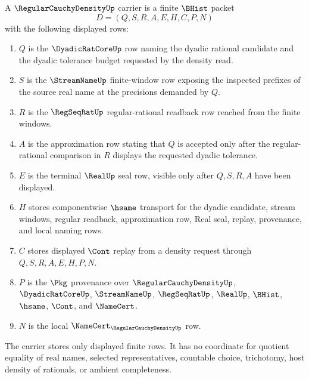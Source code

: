 \begin{definition}
\label{def:regular-cauchy-density-carrier}
A $\RegularCauchyDensityUp$ carrier is a finite $\BHist$ packet
$$
D=(Q,S,R,A,E,H,C,P,N)
$$
with the following displayed rows:
\begin{enumerate}
\item $Q$ is the $\DyadicRatCoreUp$ row naming the dyadic rational candidate
and the dyadic tolerance budget requested by the density read.
\item $S$ is the $\StreamNameUp$ finite-window row exposing the inspected
prefixes of the source real name at the precisions demanded by $Q$.
\item $R$ is the $\RegSeqRatUp$ regular-rational readback row reached from the
finite windows.
\item $A$ is the approximation row stating that $Q$ is accepted only after the
regular-rational comparison in $R$ displays the requested dyadic tolerance.
\item $E$ is the terminal $\RealUp$ seal row, visible only after $Q,S,R,A$
have been displayed.
\item $H$ stores componentwise $\hsame$ transport for the dyadic candidate,
stream windows, regular readback, approximation row, Real seal, replay,
provenance, and local naming rows.
\item $C$ stores displayed $\Cont$ replay from a density request through
$Q,S,R,A,E,H,P,N$.
\item $P$ is the $\Pkg$ provenance over $\RegularCauchyDensityUp$,
$\DyadicRatCoreUp$, $\StreamNameUp$, $\RegSeqRatUp$, $\RealUp$, $\BHist$,
$\hsame$, $\Cont$, and $\NameCert$.
\item $N$ is the local $\NameCert_{\RegularCauchyDensityUp}$ row.
\end{enumerate}
The carrier stores only displayed finite rows. It has no coordinate for
quotient equality of real names, selected representatives, countable choice,
trichotomy, host density of rationals, or ambient completeness.
\end{definition}

